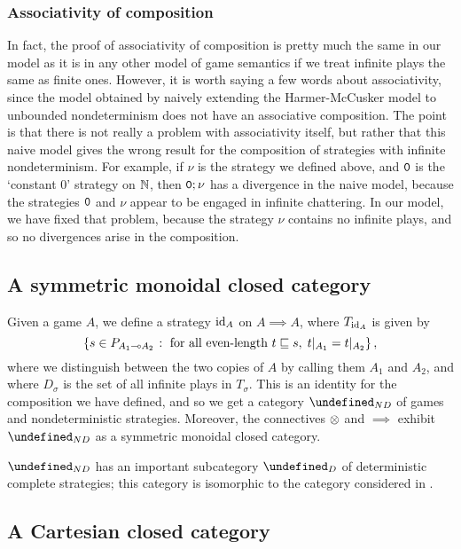 \documentclass[sigplan,9pt,review]{acmart}\settopmatter{printfolios=true,printccs=false,printacmref=false}
\let\G\undefined
\begin{document}
\subsubsection{Associativity of composition}

In fact, the proof of associativity of composition is pretty much the same in our model as it is in any other model of game semantics if we treat infinite plays the same as finite ones.
However, it is worth saying a few words about associativity, since the model obtained by naively extending the Harmer-McCusker model to unbounded nondeterminism does not have an associative composition.  
The point is that there is not really a problem with associativity itself, but rather that this naive model gives the wrong result for the composition of strategies with infinite nondeterminism.
For example, if $\nu$ is the strategy we defined above, and ${\mathtt{0}}$ is the `constant $0$' strategy on $\mathbb{N}$, then ${\mathtt{0}};\nu$ has a divergence in the naive model, because the strategies ${\mathtt{0}}$ and $\nu$ appear to be engaged in infinite chattering.  
In our model, we have fixed that problem, because the strategy $\nu$ contains no infinite plays, and so no divergences arise in the composition.

\subsection{A symmetric monoidal closed category}

Given a game $A$, we define a strategy $\operatorname{id}_A$ on $A\implies A$, where $T_{\operatorname{id}_A}$ is given by
\[
  \{s\in P_{A_1\multimap A_2}\;\colon\;\textrm{for all even-length }t\sqsubseteq s,\;t\vert_{A_1}=t\vert_{A_2}\}\,,
  \]
where we distinguish between the two copies of $A$ by calling them $A_1$ and $A_2$, and where $D_\sigma$ is the set of all infinite plays in $T_\sigma$.
This is an identity for the composition we have defined, and so we get a category $\G_{ND}$ of games and nondeterministic strategies.
Moreover, the connectives $\otimes$ and $\implies$ exhibit $\G_{ND}$ as a symmetric monoidal closed category.  

$\G_{ND}$ has an important subcategory $\G_D$ of deterministic complete strategies; this category is isomorphic to the category considered in \cite{SamsonGuyIAPassive}.

\subsection{A Cartesian closed category}
\end{document}
